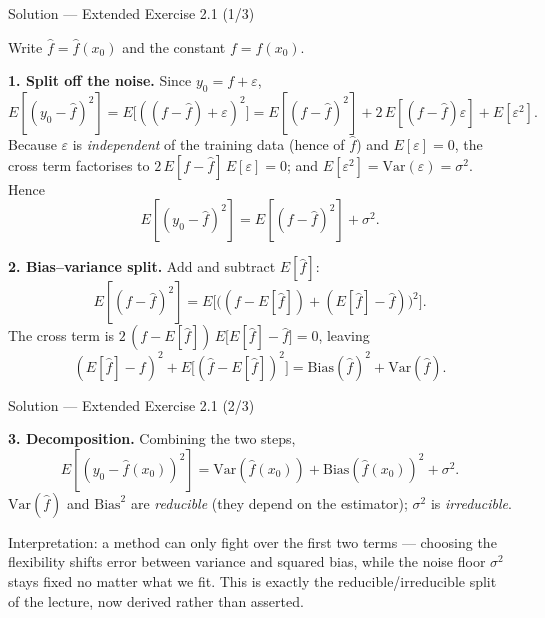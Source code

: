 \documentclass[aspectratio=169,11pt]{beamer}
\begin{document}
\begin{frame}{Solution --- Extended Exercise 2.1 (1/3)}
\begin{solutionbox}
Write $\hat f=\hat f(x_0)$ and the constant $f=f(x_0)$.

\textbf{1. Split off the noise.} Since $y_0=f+\varepsilon$,
\[
E[(y_0-\hat f)^2]=E\big[((f-\hat f)+\varepsilon)^2\big]
 =E[(f-\hat f)^2]+2\,E[(f-\hat f)\varepsilon]+E[\varepsilon^2].
\]
Because $\varepsilon$ is \emph{independent} of the training data (hence of $\hat f$) and $E[\varepsilon]=0$, the cross term factorises to $2\,E[f-\hat f]\,E[\varepsilon]=0$; and $E[\varepsilon^2]=\mathrm{Var}(\varepsilon)=\sigma^2$. Hence
\[
E[(y_0-\hat f)^2]=E[(f-\hat f)^2]+\sigma^2 .
\]

\textbf{2. Bias--variance split.} Add and subtract $E[\hat f]$:
\[
E[(f-\hat f)^2]=E\big[\big((f-E[\hat f])+(E[\hat f]-\hat f)\big)^2\big].
\]
The cross term is $2\,(f-E[\hat f])\,E\big[E[\hat f]-\hat f\big]=0$, leaving
\[
(E[\hat f]-f)^2+E\big[(\hat f-E[\hat f])^2\big]=\mathrm{Bias}(\hat f)^2+\mathrm{Var}(\hat f).
\]
\end{solutionbox}
\end{frame}

\begin{frame}{Solution --- Extended Exercise 2.1 (2/3)}
\begin{solutionbox}
\textbf{3. Decomposition.} Combining the two steps,
\[
\boxed{\,E[(y_0-\hat f(x_0))^2]=\mathrm{Var}(\hat f(x_0))+\mathrm{Bias}(\hat f(x_0))^2+\sigma^2 .\,}
\]
$\mathrm{Var}(\hat f)$ and $\mathrm{Bias}^2$ are \emph{reducible} (they depend on the estimator); $\sigma^2$ is \emph{irreducible}.

Interpretation: a method can only fight over the first two terms ---
choosing the flexibility shifts error between variance and squared
bias, while the noise floor $\sigma^2$ stays fixed no matter what we
fit. This is exactly the reducible/irreducible split of the lecture,
now derived rather than asserted.
\end{solutionbox}
\end{frame}
\end{document}
